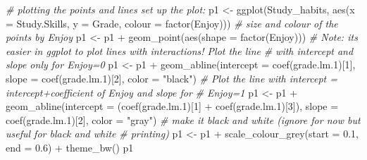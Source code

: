 \documentclass[
]{gitbook}
\newenvironment{Shaded}{\begin{snugshade}}{\end{snugshade}}
\newcommand{\AttributeTok}[1]{\textcolor[rgb]{0.77,0.63,0.00}{#1}}
\newcommand{\CommentTok}[1]{\textcolor[rgb]{0.56,0.35,0.01}{\textit{#1}}}
\newcommand{\DecValTok}[1]{\textcolor[rgb]{0.00,0.00,0.81}{#1}}
\newcommand{\FloatTok}[1]{\textcolor[rgb]{0.00,0.00,0.81}{#1}}
\newcommand{\FunctionTok}[1]{\textcolor[rgb]{0.00,0.00,0.00}{#1}}
\newcommand{\NormalTok}[1]{#1}
\newcommand{\OtherTok}[1]{\textcolor[rgb]{0.56,0.35,0.01}{#1}}
\newcommand{\SpecialCharTok}[1]{\textcolor[rgb]{0.00,0.00,0.00}{#1}}
\newcommand{\StringTok}[1]{\textcolor[rgb]{0.31,0.60,0.02}{#1}}
\begin{document}
\begin{Shaded}
\begin{Highlighting}[]
\CommentTok{\# plotting the points and lines set up the plot:}
\NormalTok{p1 }\OtherTok{\textless{}{-}} \FunctionTok{ggplot}\NormalTok{(Study\_habits, }\FunctionTok{aes}\NormalTok{(}\AttributeTok{x =}\NormalTok{ Study.Skills, }\AttributeTok{y =}\NormalTok{ Grade, }\AttributeTok{colour =} \FunctionTok{factor}\NormalTok{(Enjoy)))}
\CommentTok{\# size and colour of the points by Enjoy}
\NormalTok{p1 }\OtherTok{\textless{}{-}}\NormalTok{ p1 }\SpecialCharTok{+} \FunctionTok{geom\_point}\NormalTok{(}\FunctionTok{aes}\NormalTok{(}\AttributeTok{shape =} \FunctionTok{factor}\NormalTok{(Enjoy)))}
\CommentTok{\# Note: it\textquotesingle{}s easier in ggplot to plot lines with interactions! Plot the line}
\CommentTok{\# with intercept and slope only for Enjoy=0}
\NormalTok{p1 }\OtherTok{\textless{}{-}}\NormalTok{ p1 }\SpecialCharTok{+} \FunctionTok{geom\_abline}\NormalTok{(}\AttributeTok{intercept =} \FunctionTok{coef}\NormalTok{(grade.lm}\FloatTok{.1}\NormalTok{)[}\DecValTok{1}\NormalTok{], }\AttributeTok{slope =} \FunctionTok{coef}\NormalTok{(grade.lm}\FloatTok{.1}\NormalTok{)[}\DecValTok{2}\NormalTok{],}
    \AttributeTok{color =} \StringTok{"black"}\NormalTok{)}
\CommentTok{\# Plot the line with intercept = intercept+coefficient of Enjoy and slope for}
\CommentTok{\# Enjoy=1}
\NormalTok{p1 }\OtherTok{\textless{}{-}}\NormalTok{ p1 }\SpecialCharTok{+} \FunctionTok{geom\_abline}\NormalTok{(}\AttributeTok{intercept =}\NormalTok{ (}\FunctionTok{coef}\NormalTok{(grade.lm}\FloatTok{.1}\NormalTok{)[}\DecValTok{1}\NormalTok{] }\SpecialCharTok{+} \FunctionTok{coef}\NormalTok{(grade.lm}\FloatTok{.1}\NormalTok{)[}\DecValTok{3}\NormalTok{]), }\AttributeTok{slope =} \FunctionTok{coef}\NormalTok{(grade.lm}\FloatTok{.1}\NormalTok{)[}\DecValTok{2}\NormalTok{],}
    \AttributeTok{color =} \StringTok{"gray"}\NormalTok{)}
\CommentTok{\# make it black and white (ignore for now but useful for black and white}
\CommentTok{\# printing)}
\NormalTok{p1 }\OtherTok{\textless{}{-}}\NormalTok{ p1 }\SpecialCharTok{+} \FunctionTok{scale\_colour\_grey}\NormalTok{(}\AttributeTok{start =} \FloatTok{0.1}\NormalTok{, }\AttributeTok{end =} \FloatTok{0.6}\NormalTok{) }\SpecialCharTok{+} \FunctionTok{theme\_bw}\NormalTok{()}
\NormalTok{p1}
\end{Highlighting}
\end{Shaded}

\end{document}
